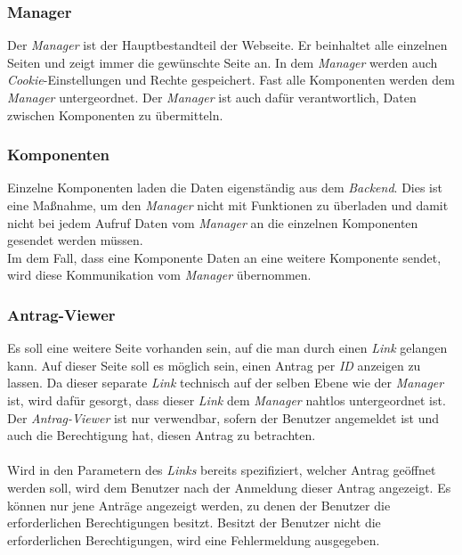 \subsubsection{Manager}
Der \textit{Manager} ist der Hauptbestandteil der Webseite. Er beinhaltet alle einzelnen Seiten und zeigt immer die gewünschte Seite an. In dem \textit{Manager} werden auch \textit{Cookie}-Einstellungen und Rechte gespeichert. Fast alle Komponenten werden dem \textit{Manager} untergeordnet. Der \textit{Manager} ist auch dafür verantwortlich, Daten zwischen Komponenten zu übermitteln.

\subsubsection{Komponenten}
Einzelne Komponenten laden die Daten eigenständig aus dem \textit{Backend}. Dies ist eine Maßnahme, um den \textit{Manager} nicht mit Funktionen zu überladen und damit nicht bei jedem Aufruf Daten vom \textit{Manager} an die einzelnen Komponenten gesendet werden müssen.\\
Im dem Fall, dass eine Komponente Daten an eine weitere Komponente sendet, wird diese Kommunikation vom \textit{Manager} übernommen.

\subsubsection{Antrag-Viewer}
Es soll eine weitere Seite vorhanden sein, auf die man durch einen \textit{Link} gelangen kann. Auf dieser Seite soll es möglich sein, einen Antrag per \textit{ID} anzeigen zu lassen. Da dieser separate \textit{Link} technisch auf der selben Ebene wie der \textit{Manager} ist, wird dafür gesorgt, dass dieser \textit{Link} dem \textit{Manager} nahtlos untergeordnet ist. Der \textit{Antrag-Viewer} ist nur verwendbar, sofern der Benutzer angemeldet ist und auch die Berechtigung hat, diesen Antrag zu betrachten.
\\\\
Wird in den Parametern des \textit{Links} bereits spezifiziert, welcher Antrag geöffnet werden soll, wird dem Benutzer nach der Anmeldung dieser Antrag angezeigt. Es können nur jene Anträge angezeigt werden, zu denen der Benutzer die erforderlichen Berechtigungen besitzt. Besitzt der Benutzer nicht die erforderlichen Berechtigungen, wird eine Fehlermeldung ausgegeben.

